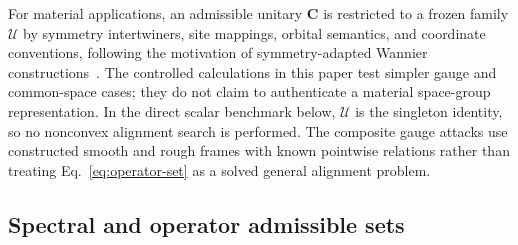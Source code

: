 \documentclass[preprint,12pt]{elsarticle}
\begin{document}
For material applications, an admissible unitary $\bm{C}$ is restricted to a
frozen family $\mathcal{U}$ by symmetry intertwiners, site mappings, orbital
semantics, and coordinate conventions, following the motivation of
symmetry-adapted Wannier constructions~\cite{sakuma2013}. The controlled calculations in this paper test simpler gauge and common-space
cases; they do not claim to authenticate a material space-group
representation. In the direct scalar benchmark below, $\mathcal{U}$ is the
singleton identity, so no nonconvex alignment search is performed. The
composite gauge attacks use constructed smooth and rough frames with known
pointwise relations rather than treating Eq.~\eqref{eq:operator-set} as a
solved general alignment problem.

\subsection{Spectral and operator admissible sets}
\label{sec:admissible-sets}
\end{document}
